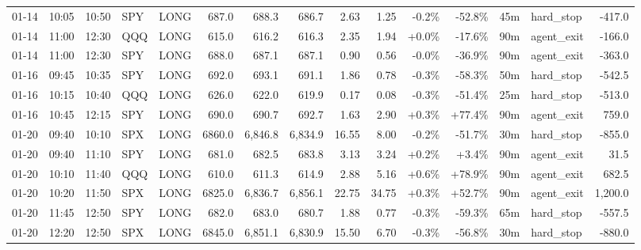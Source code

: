 \documentclass[11pt,a4paper,twoside]{article}
\begin{document}
\begin{landscape}
\begin{center}
\begin{longtable}{>{\color{txtmain}}l l l l l r r r r r r r r >{\color{txtmain}}l r}
01-14 & 10:05 & 10:50 & SPY & LONG & 687.0 & 688.3 & 686.7 & 2.63 & 1.25 & \textcolor{lossred}{-0.2\%} & \textcolor{lossred}{-52.8\%} & 45m & hard\_stop & \textcolor{lossred}{-417.0} \\
01-14 & 11:00 & 12:30 & QQQ & LONG & 615.0 & 616.2 & 616.3 & 2.35 & 1.94 & \textcolor{wingreen}{+0.0\%} & \textcolor{lossred}{-17.6\%} & 90m & agent\_exit & \textcolor{lossred}{-166.0} \\
01-14 & 11:00 & 12:30 & SPY & LONG & 688.0 & 687.1 & 687.1 & 0.90 & 0.56 & \textcolor{lossred}{-0.0\%} & \textcolor{lossred}{-36.9\%} & 90m & agent\_exit & \textcolor{lossred}{-363.0} \\
01-16 & 09:45 & 10:35 & SPY & LONG & 692.0 & 693.1 & 691.1 & 1.86 & 0.78 & \textcolor{lossred}{-0.3\%} & \textcolor{lossred}{-58.3\%} & 50m & hard\_stop & \textcolor{lossred}{-542.5} \\
01-16 & 10:15 & 10:40 & QQQ & LONG & 626.0 & 622.0 & 619.9 & 0.17 & 0.08 & \textcolor{lossred}{-0.3\%} & \textcolor{lossred}{-51.4\%} & 25m & hard\_stop & \textcolor{lossred}{-513.0} \\
01-16 & 10:45 & 12:15 & SPY & LONG & 690.0 & 690.7 & 692.7 & 1.63 & 2.90 & \textcolor{wingreen}{+0.3\%} & \textcolor{wingreen}{+77.4\%} & 90m & agent\_exit & \textcolor{wingreen}{759.0} \\
01-20 & 09:40 & 10:10 & SPX & LONG & 6860.0 & 6,846.8 & 6,834.9 & 16.55 & 8.00 & \textcolor{lossred}{-0.2\%} & \textcolor{lossred}{-51.7\%} & 30m & hard\_stop & \textcolor{lossred}{-855.0} \\
01-20 & 09:40 & 11:10 & SPY & LONG & 681.0 & 682.5 & 683.8 & 3.13 & 3.24 & \textcolor{wingreen}{+0.2\%} & \textcolor{wingreen}{+3.4\%} & 90m & agent\_exit & \textcolor{wingreen}{31.5} \\
01-20 & 10:10 & 11:40 & QQQ & LONG & 610.0 & 611.3 & 614.9 & 2.88 & 5.16 & \textcolor{wingreen}{+0.6\%} & \textcolor{wingreen}{+78.9\%} & 90m & agent\_exit & \textcolor{wingreen}{682.5} \\
01-20 & 10:20 & 11:50 & SPX & LONG & 6825.0 & 6,836.7 & 6,856.1 & 22.75 & 34.75 & \textcolor{wingreen}{+0.3\%} & \textcolor{wingreen}{+52.7\%} & 90m & agent\_exit & \textcolor{wingreen}{1,200.0} \\
01-20 & 11:45 & 12:50 & SPY & LONG & 682.0 & 683.0 & 680.7 & 1.88 & 0.77 & \textcolor{lossred}{-0.3\%} & \textcolor{lossred}{-59.3\%} & 65m & hard\_stop & \textcolor{lossred}{-557.5} \\
01-20 & 12:20 & 12:50 & SPX & LONG & 6845.0 & 6,851.1 & 6,830.9 & 15.50 & 6.70 & \textcolor{lossred}{-0.3\%} & \textcolor{lossred}{-56.8\%} & 30m & hard\_stop & \textcolor{lossred}{-880.0} \\

\end{longtable}
\end{center}
\end{landscape}
\end{document}

